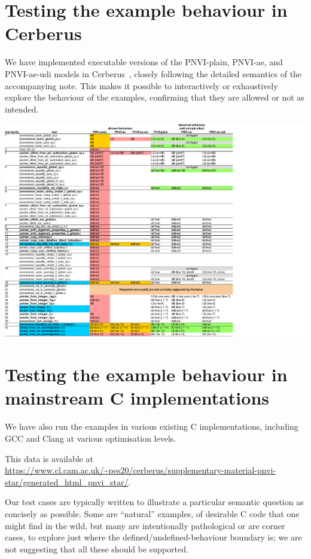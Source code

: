 \documentclass[acmsmall,review,screen]{acmart}\settopmatter{printfolios=true,printccs=false,printacmref=false}
\begin{document}
\newpage
\section{Testing the example behaviour in Cerberus}
We have implemented executable versions of the PNVI-plain, PNVI-ae,
and PNVI-ae-udi models in
Cerberus~\cite{cerberus-popl2019,Cerberus-PLDI16},
closely following the detailed semantics of the accompanying note.
This makes it possible to interactively or exhaustively explore the
behaviour of the examples, confirming that they are allowed or not as
intended.

\noindent
\includegraphics[width=1.3\textwidth]{tests_status.pdf}



\newpage
\section{Testing the example behaviour in mainstream C implementations}
We have also run the examples in various existing C implementations,
including GCC and Clang at various optimisation levels.  

This data is available at
\url{https://www.cl.cam.ac.uk/~pes20/cerberus/supplementary-material-pnvi-star/generated_html_pnvi_star/}.

Our test cases are typically written to illustrate a particular
semantic question as concisely as possible. Some are ``natural''
examples, of desirable C code that one might find in the wild, but
many are intentionally pathological or are corner cases, to explore
just where the defined/undefined-behaviour boundary is; we are not
suggesting that all these should be supported.
\end{document}
